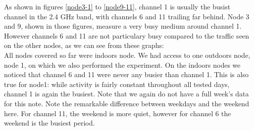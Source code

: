 \documentclass[a4paper, 11pt]{article}
\begin{document}
As shown in figures \ref{node3-1} to \ref{node9-11}, channel 1 is usually the busist channel in the 2.4 GHz band, with channels 6 and 11 trailing far behind. Node 3 and 9, shown in those figures, measure a very busy medium around channel 1. However channels 6 and 11 are not particulary busy compared to the traffic seen on the other nodes, as we can see from these graphs:\\

\newpage
All nodes covered so far were indoors node. We had access to one outdoors node, node 1, on which we also performed the experiment. On the indoors nodes we noticed that channel 6 and 11 were never any busier than channel 1. This is also true for node1: while activity is fairly constant throughout all tested days, channel 1 is again the busiest. Note that we again do not have a full week's data for this note. Note the remarkable difference between weekdays and the weekend here. For channel 11, the weekend is more quiet, however for channel 6 the weekend is the busiest period.
\end{document}
